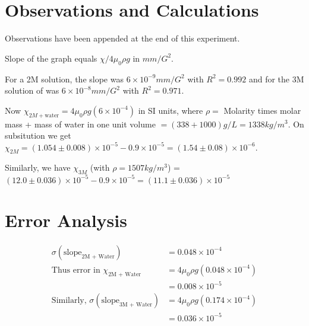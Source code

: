 \section{Observations and Calculations}
	Observations have been appended at the end of this experiment.
	\par
	Slope of the graph equals $\chi / 4\mu_0 \rho g$ in $mm/G^2$. 
	\par
	For a 2M solution, the slope was $6\times 10 ^{-9} mm/G^2$ with $R^2=0.992$ and for the 3M solution of was $6\times 10 ^{-8} mm/G^2$ with $R^2=0.971$. 
	\par
	Now $\chi_{2M + \text{water}}=4\mu_0 \rho g (6\times 10^{-4})$ in SI units, where $\rho=$ Molarity times molar mass + mass of water in one unit volume $=(338+1000) g/L = 1338 kg/m^3$. On subsitution we get
	$\chi_{2M}=(1.054 \pm 0.008) \times10^{-5} - 0.9 \times 10^{-5} = (1.54 \pm 0.08) \times 10^{-6}$.
	\par
	Similarly, we have $\chi_{3M}$ (with $\rho=1507 kg/m^3$) = $(12.0 \pm 0.036) \times 10^{-5} - 0.9 \times 10^{-5} = (11.1 \pm 0.036) \times 10^{-5}$

\section{Error Analysis}
	\begin{align}
		\sigma (\text{slope}_{\text{2M + Water}})			&=0.048\times10^{-4}\\
		\text{Thus error in $\chi_{\text{2M + Water}}$} 	&=4\mu_0 \rho g (0.048\times10^{-4})\\
															&=0.008\times10^{-5}\\
		\text{Similarly, } \sigma(\text{slope}_{\text{3M + Water}}) &=4\mu_0 \rho g (0.174\times10^{-4})\\
																	&=0.036\times10^{-5}
	\end{align}


